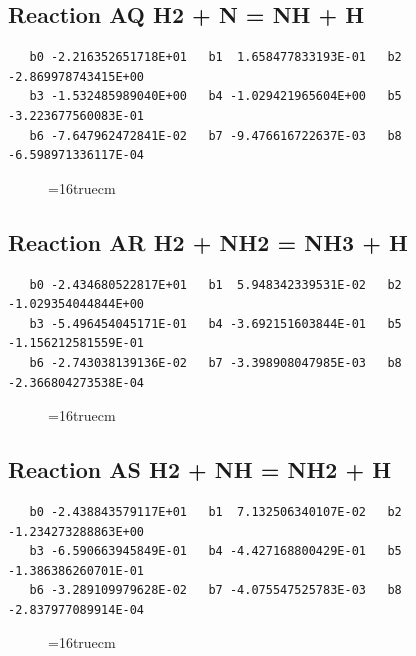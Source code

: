 \documentclass[12pt,dvipdfm]{article}
\begin{document}
\subsection{
Reaction AQ H2 + N = NH + H }
\begin{small}\begin{verbatim}
   b0 -2.216352651718E+01   b1  1.658477833193E-01   b2 -2.869978743415E+00
   b3 -1.532485989040E+00   b4 -1.029421965604E+00   b5 -3.223677560083E-01
   b6 -7.647962472841E-02   b7 -9.476616722637E-03   b8 -6.598971336117E-04
\end{verbatim}\end{small}
\begin{figure}[h!] \label{n2rates}
\epsfxsize=16truecm
\end{figure}
\newpage

\subsection{
Reaction AR H2 + NH2 = NH3 + H }
\begin{small}\begin{verbatim}
   b0 -2.434680522817E+01   b1  5.948342339531E-02   b2 -1.029354044844E+00
   b3 -5.496454045171E-01   b4 -3.692151603844E-01   b5 -1.156212581559E-01
   b6 -2.743038139136E-02   b7 -3.398908047985E-03   b8 -2.366804273538E-04
\end{verbatim}\end{small}
\begin{figure}[h!] \label{n2rates}
\epsfxsize=16truecm
\end{figure}
\newpage

\subsection{
Reaction AS H2 + NH = NH2 + H }
\begin{small}\begin{verbatim}
   b0 -2.438843579117E+01   b1  7.132506340107E-02   b2 -1.234273288863E+00
   b3 -6.590663945849E-01   b4 -4.427168800429E-01   b5 -1.386386260701E-01
   b6 -3.289109979628E-02   b7 -4.075547525783E-03   b8 -2.837977089914E-04
\end{verbatim}\end{small}
\begin{figure}[h!] \label{n2rates}
\epsfxsize=16truecm
\end{figure}
\newpage
\end{document}
